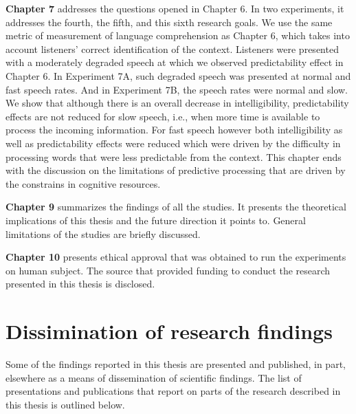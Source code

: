 \documentclass[a4paper, nobind]{templates/ociamthesis}
\begin{document}
\textbf{Chapter 7} addresses the questions opened in Chapter 6.
In two experiments, it addresses the fourth, the fifth, and this sixth research goals.
We use the same metric of measurement of language comprehension as Chapter 6, which takes into account listeners' correct identification of the context.
Listeners were presented with a moderately degraded speech at which we observed predictability effect in Chapter 6.
In Experiment 7A, such degraded speech was presented at normal and fast speech rates.
And in Experiment 7B, the speech rates were normal and slow.
We show that although there is an overall decrease in intelligibility, predictability effects are not reduced for slow speech, i.e., when more time is available to process the incoming information.
For fast speech however both intelligibility as well as predictability effects were reduced
which were driven by the difficulty in processing words that were less predictable from the context.
This chapter ends with the discussion on the limitations of predictive processing that are driven by the constrains in cognitive resources.

\textbf{Chapter 9} summarizes the findings of all the studies.
It presents the theoretical implications of this thesis and the future direction it points to.
General limitations of the studies are briefly discussed.

\textbf{Chapter 10} presents ethical approval that was obtained to run the experiments on human subject.
The source that provided funding to conduct the research presented in this thesis is disclosed.

\hypertarget{dissimination-of-research-findings}{%
\section{Dissimination of research findings}\label{dissimination-of-research-findings}}

Some of the findings reported in this thesis are presented and published, in part, elsewhere as a means of dissemination of scientific findings.
The list of presentations and publications that report on parts of the research described in this thesis is outlined below.
\end{document}

